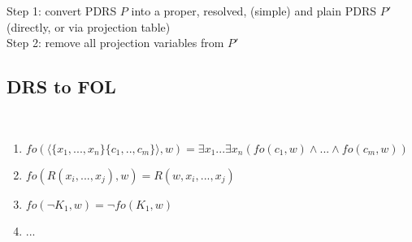 Step 1: convert PDRS $P$ into a proper, resolved, (simple) and plain PDRS $P'$ (directly, or via projection table)\\

\noindent Step 2: remove all projection variables from $P'$

\subsection{DRS to FOL}


\begin{definition}~
  \begin{enumerate}
    \item $fo(\langle\{x_1,...,x_n\}\{c_1,..,c_m\}\rangle,w) 
      = \exists x_1...\exists x_n(fo(c_1,w)\wedge...\wedge fo(c_m,w))$
    \item $fo(R(x_i,...,x_j),w) = R(w,x_i,...,x_j)$
    \item $fo(\neg K_1,w) = \neg fo(K_1,w)$
    \item ...
  \end{enumerate}
\end{definition}



